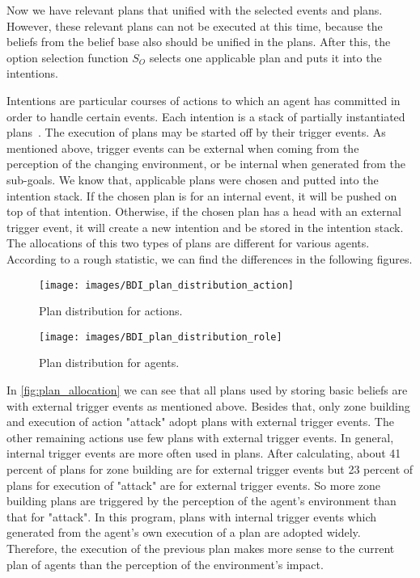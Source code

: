 Now we have relevant plans that unified with the selected events and plans.
However, these relevant plans can not be executed at this time, because the beliefs from the belief base also should be unified in the plans.
After this, the option selection function $S_O$ selects one applicable plan and puts it into the intentions.

Intentions are particular courses of actions to which an agent has committed in order to handle certain events.
Each intention is a stack of partially instantiated plans~\cite{rafael_Javabased_2007}.
The execution of plans may be started off by their trigger events.
As mentioned above, trigger events can be external when coming from the perception of the changing environment, or be internal when generated from the sub-goals.
We know that, applicable plans were chosen and putted into the intention stack.
If the chosen plan is for an internal event, it will be pushed on top of that intention.
Otherwise, if the chosen plan has a head with an external trigger event, it will create a new intention and be stored in the intention stack.
The allocations of this two types of plans are different for various agents.
According to a rough statistic, we can find the differences in the following figures.
\begin{figure}
  \centering
  \texttt{[image: images/BDI\_plan\_distribution\_action]}
  \caption{Plan distribution for actions.}
  \label{fig:plan_allocation}
\end{figure}
\begin{figure}
  \centering
  \texttt{[image: images/BDI\_plan\_distribution\_role]}
  \caption{Plan distribution for agents.}
  \label{fig:baselinex}
\end{figure}

In \autoref{fig:plan_allocation} we can see that all plans used by storing basic beliefs are with external trigger events as mentioned above.
Besides that, only zone building and execution of action "attack" adopt plans with external trigger events.
The other remaining actions use few plans with external trigger events.
In general, internal trigger events are more often used in plans.
After calculating, about 41 percent of plans for zone building are for external trigger events but 23 percent of plans for execution of "attack" are for external trigger events.
So more zone building plans are triggered by the perception of the agent's environment than that for "attack".
In this program, plans with internal trigger events which generated from the agent's own execution of a plan are adopted widely.
Therefore, the execution of the previous plan makes more sense to the current plan of agents than the perception of the environment's impact.

